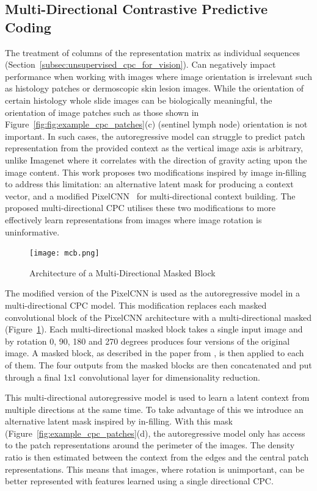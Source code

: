 \subsection{Multi-Directional Contrastive Predictive Coding}
\label{subsec:unsupervised_mdcpc}
The treatment of columns of the representation matrix as individual sequences (Section~\ref{subsec:unsupervised_cpc_for_vision}). Can negatively impact performance when working with images where image orientation is irrelevant such as histology patches or dermoscopic skin lesion images. While the orientation of certain histology whole slide images can be biologically meaningful, the orientation of image patches such as those shown in Figure~\ref{fig:fig:example_cpc_patches}(c) (sentinel lymph node) orientation is not important. In such cases, the autoregressive model can struggle to predict patch representation from the provided context as the vertical image axis is arbitrary, unlike Imagenet where it correlates with the direction of gravity acting upon the image content. This work proposes two modifications inspired by image in-filling to address this limitation: an alternative latent mask for producing a context vector, and a modified PixelCNN~\citep{oord2016pixel} for multi-directional context building. The proposed multi-directional CPC utilises these two modifications to more effectively learn representations from images where image rotation is uninformative.

\begin{figure}
	\centering
	\texttt{[image: mcb.png]}
	\caption{Architecture of a Multi-Directional Masked Block}
	\label{fig:multi-directional_masked_block}
\end{figure}

The modified version of the PixelCNN is used as the autoregressive model in a multi-directional CPC model. This modification replaces each masked convolutional block of the PixelCNN architecture with a multi-directional masked (Figure~\ref{fig:multi-directional_masked_block}). Each multi-directional masked block takes a single input image and by rotation 0, 90, 180 and 270 degrees produces four versions of the original image. A masked block, as described in the paper from \cite{oord2016pixel}, is then applied to each of them. The four outputs from the masked blocks are then concatenated and put through a final 1x1 convolutional layer for dimensionality reduction.

This multi-directional autoregressive model is used to learn a latent context from multiple directions at the same time. To take advantage of this we introduce an alternative latent mask inspired by in-filling. With this mask (Figure~\ref{fig:example_cpc_patches}(d), the autoregressive model only has access to the patch representations around the perimeter of the images. The density ratio is then estimated between the context from the edges and the central patch representations. This means that images, where rotation is unimportant, can be better represented with features learned using a single directional CPC.



